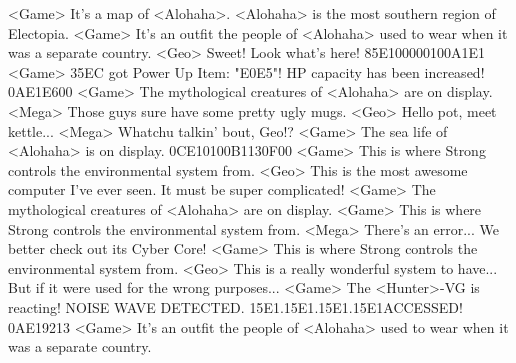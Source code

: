 <Game> It's a map of <Alohaha>. <Alohaha> is the most southern region of Electopia. 
<Game> It's an outfit the people of <Alohaha> used to wear when it was a separate country. 
<Geo> Sweet! Look what's here! 
{85}{E1}{00}{00}{01}{00}{A1}{E1} 
<Game> {35}{EC} got Power Up Item: "{E0}{E5}"! 
HP capacity has been increased! 
{0A}{E1}{E6}{00}
<Game> The mythological creatures of <Alohaha> are on display. 
<Mega> Those guys sure have some pretty ugly mugs. 
<Geo> Hello pot, meet kettle... 
<Mega> Whatchu talkin' bout, Geo!? 
<Game> The sea life of <Alohaha> is on display. 
{0C}{E1}{01}{00}{B1}{13}{0F}{00}
<Game> This is where Strong controls the environmental system from. 
<Geo> This is the most awesome computer I've ever seen. It must be super complicated! 
<Game> The mythological creatures of <Alohaha> are on display. 
<Game> This is where Strong controls the environmental system from. 
<Mega> There's an error... We better check out its Cyber Core! 
<Game> This is where Strong controls the environmental system from. 
<Geo> This is a really wonderful system to have... 
But if it were used for the wrong purposes... 
<Game> The <Hunter>-VG is reacting! 
NOISE WAVE DETECTED. {15}{E1}.{15}{E1}.{15}{E1}.{15}{E1}ACCESSED! 
{0A}{E1}{92}{13}
<Game> It's an outfit the people of <Alohaha> used to wear when it was a separate country. 
